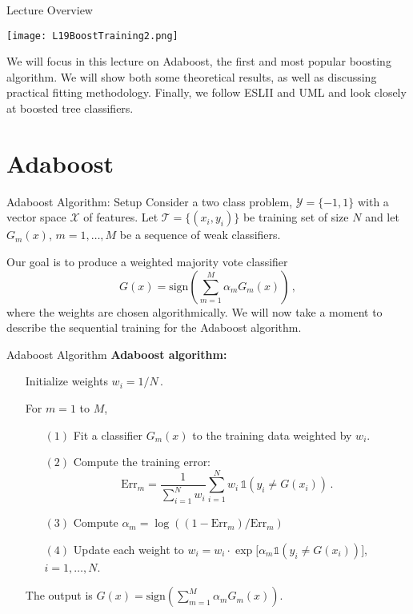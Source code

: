 \documentclass[10pt, table, dvipsnames,xcdraw, handout]{beamer}
\newcommand{\cT}{\ensuremath{\mathcal{T}}}
\newcommand{\cX}{\ensuremath{\mathcal{X}}}
\begin{document}
\begin{frame}[fragile]{Lecture Overview}
  \begin{minipage}[t][0.5\textheight][t]{\textwidth}
	\centering \texttt{[image: L19BoostTraining2.png]} 
  \end{minipage}
  \vfill
\begin{minipage}[t][0.5\textheight][t]{\textwidth}
We will focus in this lecture on Adaboost, the first and most popular boosting algorithm. We will show both some theoretical results, as well as discussing practical fitting methodology. Finally, we follow ESLII and UML and look closely at boosted tree classifiers. 
\end{minipage}
\end{frame}


\section{Adaboost}

\begin{frame}[fragile]{Adaboost Algorithm: Setup}
Consider a two class problem, $\mathcal{Y} = \{-1,1\}$ with a vector space $\cX$ of features. Let $\cT = \{(x_i,y_i)\}$ be  training set of size $N$ and let $G_m(x)$, $m=1,\ldots, M$ be a sequence of weak classifiers. \pause 

Our goal is to produce a weighted majority vote classifier
$$
G(x) = \text{sign}\left( \sum_{m=1}^M\alpha_mG_m(x) \right)\,,
$$\pause
where the weights are chosen algorithmically. We will now take a moment to describe the sequential training for the Adaboost algorithm. 
\end{frame}




\begin{frame}[fragile]{Adaboost Algorithm}
\textbf{Adaboost algorithm:}

\begin{itemize}
\item[]Initialize weights $w_i = 1/N$\,.
\item[] For $m=1$ to $M$,
\begin{itemize}
\item[$(1)$] Fit a classifier $G_m(x)$ to the training data weighted by $w_i$.
\item[$(2)$] Compute the training error:
$$
\text{Err}_m = \frac{1}{\sum_{i=1}^N w_i} \sum_{i=1}^N w_i\, \mathds{1}(y_i \neq G(x_i))\,.
$$
\item[$(3)$] Compute $\alpha_m = \log((1-\text{Err}_m)/\text{Err}_m)$
\item[$(4)$] Update each weight to $w_i = w_i\cdot \exp\big[ \alpha_m \mathds{1}(y_i \neq G(x_i)) \big]$, $i=1,\ldots, N$.
\end{itemize}
\item[] The output is $G(x)=\text{sign}\left( \sum_{m=1}^M\alpha_mG_m(x) \right)$. 
\end{itemize}
\end{frame}
\end{document}
